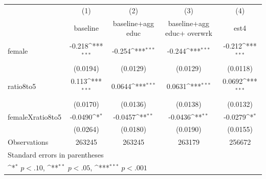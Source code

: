 {
\def\sym#1{\ifmmode^{#1}\else\(^{#1}\)\fi}
\begin{tabular}{l*{4}{c}}
\hline\hline
                    &\multicolumn{1}{c}{(1)}&\multicolumn{1}{c}{(2)}&\multicolumn{1}{c}{(3)}&\multicolumn{1}{c}{(4)}\\
                    &\multicolumn{1}{c}{baseline }&\multicolumn{1}{c}{baseline+agg educ}&\multicolumn{1}{c}{baseline+agg educ+ overwrk}&\multicolumn{1}{c}{est4}\\
\hline
female              &      -0.218\sym{***}&      -0.254\sym{***}&      -0.244\sym{***}&      -0.212\sym{***}\\
                    &    (0.0194)         &    (0.0129)         &    (0.0129)         &    (0.0118)         \\
[1em]
ratio8to5           &       0.113\sym{***}&      0.0644\sym{***}&      0.0631\sym{***}&      0.0692\sym{***}\\
                    &    (0.0170)         &    (0.0136)         &    (0.0138)         &    (0.0132)         \\
[1em]
femaleXratio8to5    &     -0.0490\sym{*}  &     -0.0457\sym{**} &     -0.0436\sym{**} &     -0.0279\sym{*}  \\
                    &    (0.0264)         &    (0.0180)         &    (0.0190)         &    (0.0155)         \\
\hline
Observations        &      263245         &      263245         &      263179         &      256672         \\
\hline\hline
\multicolumn{5}{l}{\footnotesize Standard errors in parentheses}\\
\multicolumn{5}{l}{\footnotesize \sym{*} \(p<.10\), \sym{**} \(p<.05\), \sym{***} \(p<.001\)}\\
\end{tabular}
}
